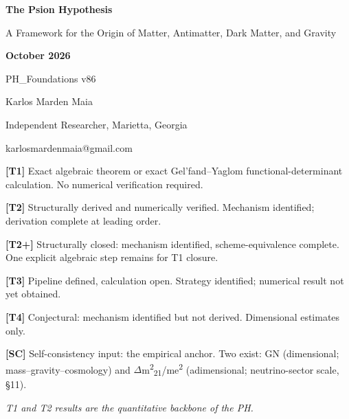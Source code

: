 \documentclass[11pt,letterpaper]{article}
\begin{document}
\begingroup\centering \Huge \textbf{The Psion Hypothesis}\par\endgroup

\begingroup\centering \Large A Framework for the Origin of Matter, Antimatter, Dark Matter, and Gravity\par\endgroup

\begingroup\centering \large \textbf{October 2026}\par\endgroup

\begingroup\centering \normalsize PH\_Foundations v86\par\endgroup

\begingroup\centering \large Karlos Marden Maia\par\endgroup

\begingroup\centering Independent Researcher, Marietta, Georgia\par\endgroup

\begingroup\centering karlosmardenmaia@gmail.com\par\endgroup

{\small \noindent \textbf{[T1] }Exact algebraic theorem or exact Gel'fand--Yaglom functional-determinant calculation. No numerical verification required.\par}

{\small \noindent \textbf{[T2] }Structurally derived and numerically verified. Mechanism identified; derivation complete at leading order.\par}

{\small \noindent \textbf{[T2+] }Structurally closed: mechanism identified, scheme-equivalence complete. One explicit algebraic step remains for T1 closure.\par}

{\small \noindent \textbf{[T3] }Pipeline defined, calculation open. Strategy identified; numerical result not yet obtained.\par}

{\small \noindent \textbf{[T4] }Conjectural: mechanism identified but not derived. Dimensional estimates only.\par}

{\small \noindent \textbf{[SC] }Self-consistency input: the empirical anchor. Two exist: GN (dimensional; mass--gravity--cosmology) and $\Delta$m\textsuperscript{2}\textsubscript{21}/me\textsuperscript{2} (adimensional; neutrino-sector scale, §11).\par}

\begingroup\centering \small \textit{T1 and T2 results are the quantitative backbone of the PH.}\par\endgroup
\end{document}
